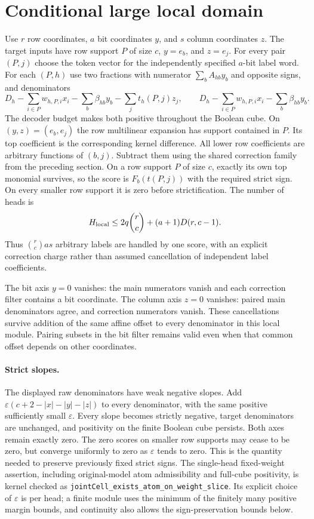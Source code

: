\documentclass[11pt]{article}
\begin{document}
\section{Conditional large local domain}

Use $r$ row coordinates, $a$ bit coordinates $y$, and $s$ column
coordinates $z$. The target inputs have row support $P$ of size $c$,
$y=e_b$, and $z=e_j$. For every pair $(P,j)$ choose the token vector for
the independently specified $a$-bit label word. For each $(P,h)$ use two
fractions with numerator $\sum_b A_{hb}y_b$ and opposite signs, and
denominators
\[
 D_h-\sum_{i\in P}w_{h,P,i}x_i-\sum_b\beta_{hb}y_b
       -\sum_jt_h(P,j)z_j,
 \qquad
 D_h-\sum_{i\in P}w_{h,P,i}x_i-\sum_b\beta_{hb}y_b.
\]
The decoder budget makes both positive throughout the Boolean cube.
On $(y,z)=(e_b,e_j)$ the row multilinear expansion has support contained
in $P$. Its top coefficient is the corresponding kernel difference.
All lower row coefficients are arbitrary functions of $(b,j)$.
Subtract them using the shared correction family from the preceding
section. On a row support $P$ of size $c$, exactly its own top monomial
survives, so the score is $F_b(t(P,j))$ with the required strict sign.
On every smaller row support it is zero before strictification.
The number of heads is
\[
 H_{\rm local}\le 2q\binom rc+(a+1)D(r,c-1).
\]
Thus $\binom rc as$ arbitrary labels are handled by one score, with
an explicit correction charge rather than assumed cancellation of
independent label coefficients.

The bit axis $y=0$ vanishes: the main numerators vanish and each
correction filter contains a bit coordinate. The column axis $z=0$
vanishes: paired main denominators agree, and correction numerators
vanish. These cancellations survive addition of the same affine
offset to every denominator in this local module. Pairing subsets in
the bit filter remains valid even when that common offset depends on
other coordinates.

\paragraph{Strict slopes.}
The displayed raw denominators have weak negative slopes. Add
$\varepsilon(c+2-|x|-|y|-|z|)$ to every denominator, with the same
positive sufficiently small $\varepsilon$. Every slope becomes
strictly negative, target denominators are unchanged, and positivity
on the finite Boolean cube persists. Both axes remain exactly zero.
The zero scores on smaller row supports may cease to be zero, but
converge uniformly to zero as $\varepsilon$ tends to zero. This is the
quantity needed to preserve previously fixed strict signs.
The single-head fixed-weight assertion, including original-model atom
admissibility and full-cube positivity, is kernel checked as
\texttt{jointCell\_exists\_atom\_on\_weight\_slice}. Its explicit
choice of $\varepsilon$ is per head; a finite module uses the minimum
of the finitely many positive margin bounds, and continuity also
allows the sign-preservation bounds below.
\end{document}
